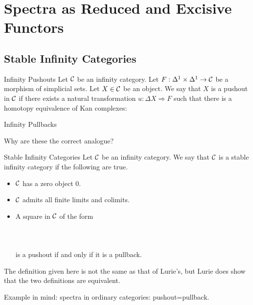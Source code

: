 \documentclass[a4paper]{article}
\begin{document}
\pagebreak
\section{Spectra as Reduced and Excisive Functors}
\subsection{Stable Infinity Categories}
\begin{defn}{Infinity Pushouts}{} Let $\mathcal{C}$ be an infinity category. Let $F:\Delta^1\times\Delta^1\to\mathcal{C}$ be a morphism of simplicial sets. Let $X\in\mathcal{C}$ be an object. We say that $X$ is a pushout in $\mathcal{C}$ if there exists a natural transformation $u:\Delta X\Rightarrow F$ such that there is a homotopy equivalence of Kan complexes: 
\end{defn}

\begin{defn}{Infinity Pullbacks}{}
\end{defn}

Why are these the correct analogue? \\

\begin{defn}{Stable Infinity Categories}{} Let $\mathcal{C}$ be an infinity category. We say that $\mathcal{C}$ is a stable infinity category if the following are true. 
\begin{itemize}
\item $\mathcal{C}$ has a zero object $0$. 
\item $\mathcal{C}$ admits all finite limits and colimits. 
\item A square in $\mathcal{C}$ of the form \\~\\
\\~\\
is a pushout if and only if it is a pullback. 
\end{itemize}
\end{defn}

The definition given here is not the same as that of Lurie's, but Lurie does show that the two definitions are equivalent. 

Example in mind: spectra in ordinary categories: pushout=pullback. 
\end{document}
